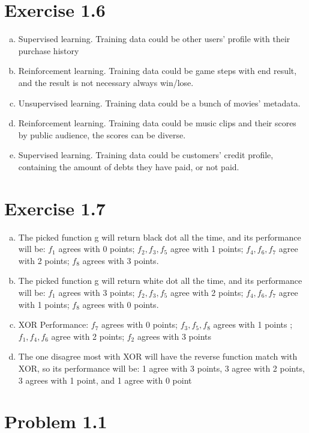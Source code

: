 \documentclass{article}
\def\math#1{$#1$}
\begin{document}
\section{Exercise 1.6}
\begin{enumerate}[a)]
    \item Supervised learning. Training data could be other users' profile with  their purchase history
    \item Reinforcement learning. Training data could be game steps with end result, and the result is not necessary always win/lose.
    \item Unsupervised learning. Training data could be a bunch of movies' metadata.
    \item Reinforcement learning. Training data could be music clips and their scores by public audience, the scores can be diverse.
    \item Supervised learning. Training data could be customers' credit profile, containing the amount of debts they have paid, or not paid.
\end{enumerate}

\section{Exercise 1.7}
\begin{enumerate}[a)]
    \item The picked function g will return black dot all the time, and its performance will be: \math{f_1} agrees with 0 points; \math{f_2, f_3, f_5} agree with 1 points; \math{f_4, f_6, f_7} agree with 2 points; \math{f_8} agrees with 3 points. 
    \item The picked function g will return white dot all the time, and its performance will be: \math{f_1} agrees with 3 points; \math{f_2, f_3, f_5} agree with 2 points; \math{f_4, f_6, f_7} agree with 1 points; \math{f_8} agrees with 0 points.
    \item XOR Performance: \math{f_7} agrees with 0 points; \math{f_3, f_5, f_8} agrees with 1 points ;\math{f_1, f_4, f_6} agree with 2 points; \math{f_2} agrees with 3 points
    \item The one disagree most with XOR will have the reverse function match with XOR, so its performance will be: 1 agree with 3 points, 3 agree with 2 points, 3 agrees with 1 point, and 1 agree with 0 point
\end{enumerate}

\section{Problem 1.1}
\end{document}
